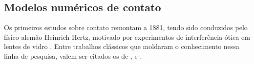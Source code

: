 \documentclass[Tese.tex]{subfiles}
\begin{document}
\subsection{Modelos numéricos de contato}

Os primeiros estudos sobre contato remontam a 1881, tendo sido conduzidos pelo físico alemão Heinrich Hertz, motivado por experimentos de interferência ótica em lentes de vidro \cite{johnson1987contact}. Entre trabalhos clássicos que moldaram o conhecimento nessa linha de pesquisa, valem ser citados os de ,  e .



\end{document}
